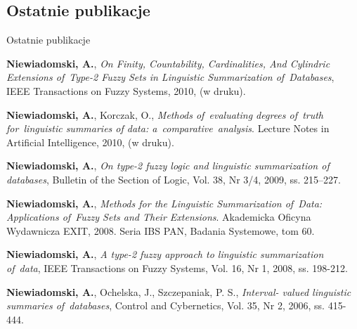 \documentclass{beamer}
\begin{document}
\subsection{Ostatnie publikacje}
\begin{frame}{Ostatnie publikacje}%
\begin{itemize}
		{\scriptsize
\item {\bf Niewiadomski, A.}, {\em   On Finity, Countability, Cardinalities, And
Cylindric Extensions of~Type-2 Fuzzy Sets in Linguistic Summarization
of~Databases}, IEEE Transactions on Fuzzy Systems, 2010, (w druku).
\item {\bf Niewiadomski, A.}, Korczak, O., {\em Methods of~evaluating degrees
of~truth for~linguistic summaries of data: a~comparative~analysis}. Lecture
Notes in Artificial Intelligence, 2010, (w druku). 
\item {\bf Niewiadomski, A.}, {\em On type-2 fuzzy logic and linguistic summarization of databases}, Bulletin of the Section of Logic, Vol. 38, Nr 3/4, 2009, ss. 215--227.
\item  {\bf Niewiadomski, A.}, {\em Methods for the Linguistic
Summarization of~Data: Applications of~Fuzzy Sets and Their
Extensions}. Akademicka
Oficyna Wydawnicza EXIT, 2008. Seria IBS PAN, Badania Systemowe, tom 60. 
\item {\bf Niewiadomski, A.}, {\em A type-2 fuzzy approach to linguistic summarization of~data}, IEEE Transactions on Fuzzy Systems, Vol. 16, Nr 1, 2008, ss. 198-212. 
\item {\bf Niewiadomski, A.}, Ochelska, J., Szczepaniak, P. S., {\em Interval-
valued linguistic summaries of~databases}, Control and Cybernetics, Vol. 35, Nr
2, 2006, ss. 415-444. 

}

\end{itemize}
\end{frame}
\end{document}
